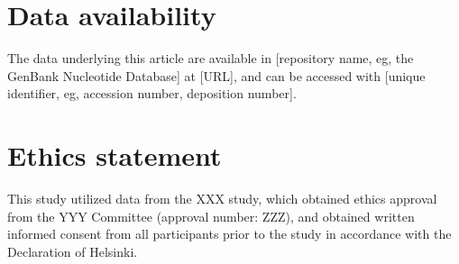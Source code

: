 \documentclass[unnumsec,webpdf,modern,large]{oup-authoring-template}%
\theoremstyle{thmstyleone}%
\theoremstyle{thmstyletwo}%
\theoremstyle{thmstylethree}%
\begin{document}
\section{Data availability}
The data underlying this article are available in [repository name, eg, the GenBank Nucleotide Database] at [URL], and can be accessed with [unique identifier, eg, accession number, deposition number].

\section{Ethics statement}
This study utilized data from the XXX study, which obtained
ethics approval from the YYY Committee (approval number: ZZZ), and obtained written informed consent from all participants prior to the study in accordance with the Declaration of
Helsinki. 

\end{document}
